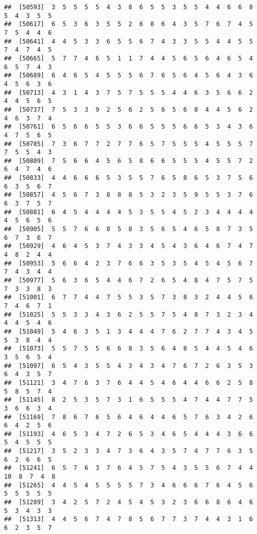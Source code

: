 \documentclass[
]{book}
\begin{document}
\begin{verbatim}
##  [50593]  3  5  5  5  5  4  3  8  6  5  5  3  5  5  4  4  6  6  8  5  4  3  5  5
##  [50617]  6  5  3  6  3  5  5  2  6  8  6  4  3  5  7  6  7  4  5  7  5  4  4  6
##  [50641]  4  4  5  3  3  6  5  5  6  7  4  3  3  5  5  4  4  5  5  7  4  7  4  5
##  [50665]  5  7  7  4  6  5  1  1  7  4  4  5  6  5  6  4  6  5  4  6  5  7  4  3
##  [50689]  6  4  6  5  4  5  5  5  6  7  6  5  6  4  5  6  4  3  6  4  5  6  3  6
##  [50713]  4  3  1  4  3  7  5  7  5  5  5  4  4  6  3  5  6  6  2  4  4  5  6  5
##  [50737]  7  5  3  3  9  2  5  6  2  5  6  5  6  8  4  4  5  6  2  4  6  3  7  4
##  [50761]  6  5  6  6  5  5  3  6  6  5  5  5  6  6  5  3  4  3  6  4  7  5  6  5
##  [50785]  7  3  6  7  7  2  7  7  6  5  7  5  5  5  4  5  5  5  7  7  5  5  4  3
##  [50809]  7  5  6  6  4  5  6  5  8  6  6  5  5  5  4  5  5  7  2  6  4  7  4  6
##  [50833]  4  4  6  6  6  5  3  5  5  7  6  5  8  6  5  3  7  5  6  6  3  5  6  7
##  [50857]  4  5  6  7  3  8  8  8  5  3  2  3  5  9  5  5  3  7  6  6  3  7  5  7
##  [50881]  6  4  5  4  4  4  4  5  3  5  5  4  5  2  3  4  4  4  4  4  5  6  5  6
##  [50905]  5  5  7  6  6  8  5  8  3  5  6  5  4  6  5  8  7  3  5  6  7  3  6  7
##  [50929]  4  6  4  5  3  7  4  3  3  4  5  4  3  6  4  6  7  4  7  4  8  2  4  4
##  [50953]  5  6  6  4  2  3  7  6  6  3  5  3  5  4  5  4  5  6  7  7  4  3  4  4
##  [50977]  5  6  3  6  5  4  4  6  7  2  6  5  4  8  4  7  5  7  5  7  3  3  8  3
##  [51001]  6  7  7  4  4  7  5  5  3  5  7  3  8  3  2  4  4  5  6  7  4  6  7  1
##  [51025]  5  5  3  3  4  3  6  2  5  5  7  5  4  8  7  3  2  3  4  4  4  5  4  6
##  [51049]  5  4  6  3  5  1  3  4  4  4  7  6  2  7  7  4  3  4  5  5  3  8  4  4
##  [51073]  5  5  7  5  5  6  6  8  3  5  6  4  8  5  4  4  5  4  6  3  5  6  5  4
##  [51097]  6  5  4  3  5  5  4  3  4  3  4  7  6  7  2  6  3  5  3  6  4  3  5  7
##  [51121]  3  4  7  6  3  7  6  4  4  5  4  6  4  4  6  6  2  5  8  5  8  5  7  4
##  [51145]  8  2  5  3  5  7  3  1  6  5  5  5  4  7  4  4  7  7  5  3  6  6  3  4
##  [51169]  7  8  6  7  6  5  6  4  6  4  4  6  5  7  6  3  4  2  6  6  4  2  5  6
##  [51193]  4  6  5  3  4  7  2  6  5  3  4  6  5  4  4  4  3  6  6  5  4  5  5  5
##  [51217]  3  5  2  3  3  4  7  3  6  4  3  5  7  4  7  7  6  3  5  6  2  6  6  5
##  [51241]  6  5  7  6  3  7  6  4  5  7  5  4  3  5  5  6  7  4  4 10  8  7  4  8
##  [51265]  4  4  5  4  5  5  5  5  7  3  4  6  6  6  7  6  4  5  6  5  5  5  5  5
##  [51289]  3  4  2  5  7  2  4  5  4  5  3  2  3  6  6  8  6  4  6  5  3  4  3  3
##  [51313]  4  4  5  6  7  4  7  8  5  6  7  7  3  7  4  4  3  1  6  6  2  3  5  7

\end{verbatim}
\end{document}
